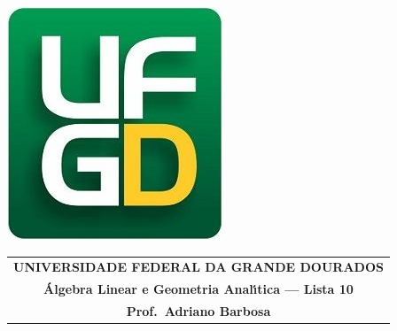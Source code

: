 \documentclass[a4paper,5pt]{amsbook}
\begin{document}
\thispagestyle{empty}
\pagestyle{empty}
\begin{minipage}[h]{0.14\textwidth}
	\includegraphics[scale=0.24]{../../ufgd.png}
\end{minipage}
\begin{minipage}[h]{\textwidth}
\begin{tabular}{c}
{{\bf UNIVERSIDADE FEDERAL DA GRANDE DOURADOS}}\\
{{\bf \'{A}lgebra Linear e Geometria Anal\'{\i}tica --- Lista 10}}\\
{{\bf Prof.\ Adriano Barbosa}}\\
\end{tabular}
\vspace{-0.45cm}
%
\end{minipage}

\end{document}
